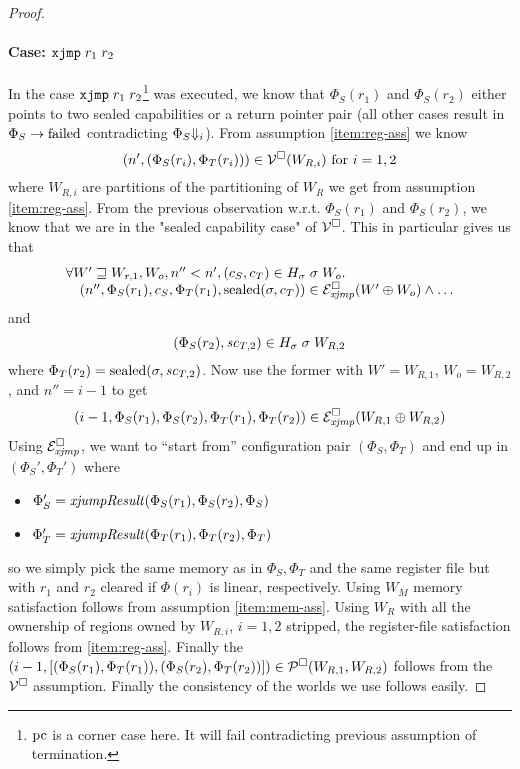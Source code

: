 \documentclass[a4paper]{article}
\begin{document}
\begin{proof}
\paragraph{Case: $\protect\txjmp{r_1}{r_2}$} 
In the case $\txjmp{r_1}{r_2}$\footnote{$\pcreg$ is a corner case here. It will fail contradicting previous assumption of termination.} was executed, we know that $\Phi_S(r_1)$ and $\Phi_S(r_2)$ either points to two sealed capabilities or a return pointer pair (all other cases result in $\Phi_S \step \failed$ contradicting $\Phi_S\term[i]$). From assumption \ref{item:reg-ass} we know
\[
  \npair[n']{(\Phi_S(r_i), \Phi_T(r_i))} \in \lrv(W_{R,i}) \text{ for $i = 1,2$}
\]
where $W_{R,i}$ are partitions of the partitioning of $W_R$ we get from assumption \ref{item:reg-ass}. From the previous observation w.r.t. $\Phi_S(r_1)$ and $\Phi_S(r_2)$, we know that we are in the "sealed capability case" of $\lrv$. This in particular gives us that
\[
  \begin{array}{l}
    \forall W' \future W_{r,1}, W_o, n'' < n', (c_S,c_T) \in H_\sigma \; \sigma \; W_o \ldotp \\
    \quad \npair[n'']{\Phi_S(r_1),c_S,\Phi_T(r_1),\sealed{\sigma,c_T}} \in \lrexj(W' \oplus W_o) \wedge \dots
  \end{array}
\]
and
\[
  (\Phi_S(r_2), \vsc_{T,2}) \in H_\sigma \; \sigma \; W_{R,2}
\]
where $\Phi_T(r_2) = \sealed{\sigma,\vsc_{T,2}}$.
Now use the former with $W'=W_{R,1}$, $W_o = W_{R,2}$, and $n'' = i-1$ to get
\[
  \npair[i-1]{\Phi_S(r_1),\Phi_S(r_2),\Phi_T(r_1),\Phi_T(r_2)} \in \lrexj(W_{R,1} \oplus W_{R,2}) 
\]
Using $\lrexj$, we want to ``start from'' configuration pair $(\Phi_S,\Phi_T)$ and end up in $(\Phi_S',\Phi_T')$ where
\begin{itemize}
\item $\Phi_S' = \xjumpResult{\Phi_S(r_1)}{\Phi_S(r_2)}{\Phi_S}$
\item $\Phi_T' = \xjumpResult{\Phi_T(r_1)}{\Phi_T(r_2)}{\Phi_T}$
\end{itemize}
so we simply pick the same memory as in $\Phi_S,\Phi_T$ and the same register file but with $r_1$ and $r_2$ cleared if $\Phi(r_i)$ is linear, respectively. Using $W_M$ memory satisfaction follows from assumption \ref{item:mem-ass}. Using $W_R$ with all the ownership of regions owned by $W_{R,i}$, $i =1,2$ stripped, the register-file satisfaction follows from \ref{item:reg-ass}. Finally the $\npair[i-1]{[(\Phi_S(r_1),\Phi_T(r_1)),(\Phi_S(r_2),\Phi_T(r_2))]}\in\lrp(W_{R,1},W_{R,2})$ follows from the $\lrv$ assumption. Finally the consistency of the worlds we use follows easily.


\end{proof}
\end{document}
